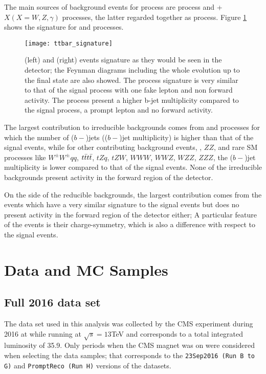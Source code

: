 The main sources of background events for \tHq process are \ttbar process and \ttbar + $X (X=W,Z,\gamma)$ processes, the latter regarded together as \ttV process. Figure \ref{fig:ttbar_sign} shows the signature for \ttbar and \ttW processes.     

\begin{figure}[!htb]
\centering
\texttt{[image: ttbar\_signature]}
\caption[\ttbar and \ttW events signature]{\ttbar(left) and \ttW(right) events signature as they would be seen in the detector; the Feynman diagrams including the whole evolution up to the final state are also showed. The \ttbar process signature is very similar to that of the signal process with one fake lepton and non forward activity. The \ttW process present a higher b-jet multiplicity compared to the signal process, a prompt lepton and no forward activity.}
\label{fig:ttbar_sign}
\end{figure}

The largest contribution to irreducible backgrounds comes from \ttW and \ttZ processes for which the number of ($b-$)jets (($b-$)jet multiplicity) is higher than that of the signal events, while for other contributing background events,  \WZ, $ZZ$, and rare SM processes like $W^\pm W^\pm qq$, $t\bar{t}t\bar{t}$, $tZq$, $tZW$, $WWW$, $WWZ$, $WZZ$, $ZZZ$, the ($b-$)jet multiplicity is lower compared to that of the signal events. None of the irreducible backgrounds present activity in the forward region of the detector.

On the side of the reducible backgrounds, the largest contribution comes from the \ttbar events which have a very similar signature to the signal events but does no present activity in the forward region of the detector either; A particular feature of the \ttbar events is their charge-symmetry, which is also a difference with respect to the signal events.
\section{Data and MC Samples} \label{secc:samples}

\subsection{ Full 2016 data set}

The data set used in this analysis was collected by the CMS experiment during 2016 at while running at $\sqrt{s}=13$TeV and corresponds to a total integrated luminosity of 35.9\fbinv. Only periods when the CMS magnet was on were considered when selecting the data samples; that corresponds to the \verb|23Sep2016 (Run B to G)| and \verb|PromptReco (Run H)| versions of the datasets.

